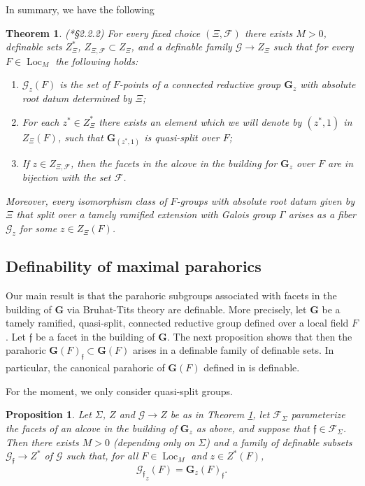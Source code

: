 \documentclass{amsart}
\newcommand{\cF}{\mathcal{F}}
\newcommand{\cG}{\mathcal{G}}
\DeclareMathOperator{\loc}{Loc}
\newcommand{\bG}{\mathbf{G}}
\newcommand{\ff}{{\mathfrak f}}
\theoremstyle{plain}
\newtheorem{theorem}[thm]{Theorem}
\newtheorem{prop}[thm]{Proposition}
\theoremstyle{definition}
\begin{document}
In summary, we have the following
\begin{theorem}\label{thm:def_groups}(\cite{gordon-hales:15a}*{\S 2.2.2})
 For every fixed choice $(\Xi, \cF)$ there exists $M>0$, definable sets $Z_{\Xi}^\ast$,
 $Z_{\Xi, \cF}\subset Z_{\Xi}$,
 and a definable family
 $\cG \to Z_{\Xi}$ such that for every $F\in \loc_M$ %
 the following holds:
 \begin{enumerate}
 \item  ${\cG_z}(F)$ is the set of $F$-points of a connected reductive group
$\bG_z$ with absolute root datum determined by $\Xi$;
\item For each $z^\ast\in Z_{\Xi}^\ast$ there exists an element which we will denote by $(z^\ast, 1)$ in $Z_{\Xi}(F)$, such that $\bG_{(z^\ast, 1)}$ is quasi-split over $F$;
\item If $z\in Z_{\Xi, \cF}$, then the facets in the alcove in the building for $\bG_z$ over $F$ are in bijection with the set $\cF$.
\end{enumerate}
Moreover, every isomorphism class of $F$-groups with absolute root datum given by $\Xi$ that split over a tamely ramified extension with Galois group $\Gamma$
arises as a fiber $\cG_z$ for some $z\in Z_\Xi(F)$.
\end{theorem}

\subsection{Definability of maximal parahorics}
Our main result is that the parahoric subgroups associated with facets in the building of $\bG$ via Bruhat-Tits theory are definable.
More precisely, let $\bG$ be a tamely ramified, quasi-split, connected reductive group defined over a local field $F$.
Let $\ff$ be a facet in the building of $\bG$.  The next proposition shows that
then the parahoric $\bG(F)_\ff\subset \bG(F)$ arises in a definable family of definable sets.
In particular, the canonical parahoric of $\bG(F)$ defined in \cite{gross:97a} is definable.

For the moment, we only consider quasi-split groups.
\begin{prop}\label{prop:main}
 Let $\Sigma$, $Z$ and $\cG\to Z$ be as in Theorem \ref{thm:def_groups}, let
 $\cF_{\Sigma}$ parameterize the facets of an alcove in the building of $\bG_z$ as above,
 and suppose that $\ff \in \cF_\Sigma$.
Then there exists $M>0$ (depending only on $\Sigma$) and a family of definable subsets $\cG_{\ff} \to Z^\ast$ of $\cG$
 such that, for all $F\in \loc_M$ and $z\in Z^\ast(F)$, 
\[
{\cG_{\ff}}_{z}(F)= \bG_z(F)_{\ff}.
\]
\end{prop}
\end{document}
